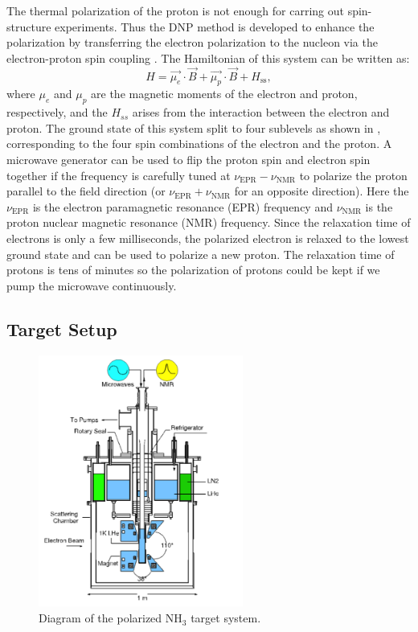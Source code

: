 The thermal polarization of the proton is not enough for carring out spin-structure experiments. Thus the DNP method is developed to enhance the polarization by transferring the electron polarization to the nucleon via the electron-proton spin coupling \cite{Overhauser1953,Jeffries1957}. The Hamiltonian of this system can be written as:
\begin{equation} \label{C5S3SS1E3}
H = \vec{\mu_e}\cdot\vec{B}+\vec{\mu_p}\cdot\vec{B}+H_{\mathrm{ss}},
\end{equation}
where $\mu_e$ and $\mu_p$ are the magnetic moments of the electron and proton, respectively, and the $H_{ss}$ arises from the interaction between the electron and proton. The ground state of this system split to four sublevels as shown in , corresponding to the four spin combinations of the electron and the proton. A microwave generator can be used to flip the proton spin and electron spin together if the frequency is carefully tuned at $\nu_{\mathrm{EPR}}-\nu_{\mathrm{NMR}}$ to polarize the proton parallel to the field direction (or $\nu_{\mathrm{EPR}}+\nu_{\mathrm{NMR}}$ for an opposite direction). Here the $\nu_{\mathrm{EPR}}$ is the electron paramagnetic resonance (EPR) frequency and $\nu_{\mathrm{NMR}}$ is the proton nuclear magnetic resonance (NMR) frequency. Since the relaxation time of electrons is only a few milliseconds, the polarized electron is relaxed to the lowest ground state and can be used to polarize a new proton. The relaxation time of protons is tens of minutes so the polarization of protons could be kept if we pump the microwave continuously.

\subsection{Target Setup}
\label{C5S3SS2}

\begin{figure}[b!]
  \centering
  \includegraphics[width=0.6\textwidth]{figs/target.png}
  \caption[Diagram of the polarized NH${}_3$ target system.]{Diagram of the polarized NH${}_3$ target system. \label{C5S3SS2F1}}
\end{figure}


